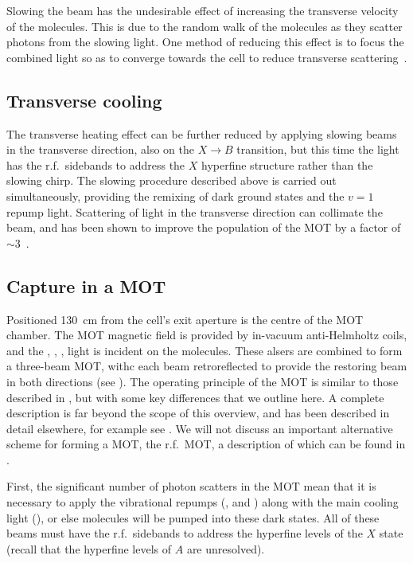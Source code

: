 Slowing the beam has the undesirable effect of increasing the transverse
velocity of the molecules. This is due to the random walk of the molecules as
they scatter photons from the slowing light. One method of reducing this effect
is to focus the combined light so as to converge towards the cell to reduce
transverse scattering~\cite{Truppe2017a}.

\subsection*{Transverse cooling}

The transverse heating effect can be further reduced by applying slowing beams
in the transverse direction, also on the $X\rightarrow B$ transition, but this
time the light has the r.f.\ sidebands to address the $X$ hyperfine structure
rather than the slowing chirp. The slowing procedure described above is carried
out simultaneously, providing the remixing of dark ground states and the $v=1$
repump light.
%
Scattering of light in the transverse direction can collimate the beam, and has
been shown to improve the population of the MOT by a factor of
$\sim3$~\cite{Jurgilas2021}.

\subsection*{Capture in a MOT}

Positioned \SI{130}{\centi\meter} from the cell's exit aperture is the centre
of the MOT chamber. The MOT magnetic field is provided by in-vacuum
anti-Helmholtz coils, and the , , ,
 light is incident on the molecules. These alsers are combined to
form a three-beam MOT, withc each beam retroreflected to provide the restoring
beam in both directions (see ).
%
The operating principle of the \CaF{} MOT is similar to those described in
, but with some key differences that we outline here.
A complete description is far beyond the scope of this overview, and has been
described in detail elsewhere, for example see .  We
will not discuss an important alternative scheme for forming a \CaF{} MOT, the
r.f.\ MOT, a description of which can be found in
.

First, the significant number of photon scatters in the MOT mean that it is
necessary to apply the vibrational repumps (,  and
) along with the main cooling light (), or else
molecules will be pumped into these dark states. All of these beams must have
the r.f.\ sidebands to address the hyperfine levels of the $X$ state (recall
that the hyperfine levels of $A$ are unresolved).

